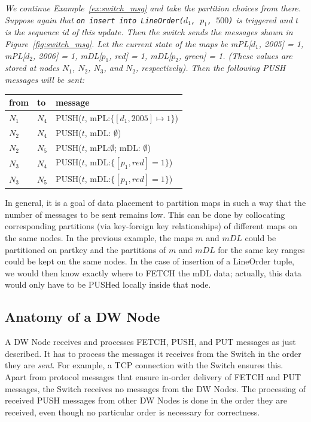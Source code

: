 \begin{example}\em
\label{ex:switch_msg2}
We continue Example~\ref{ex:switch_msg} and take the partition choices
from there.
Suppose again that
{\tt on insert into LineOrder($d_1$, $p_1$, $500$)} is triggered and $t$ is
the sequence id of this update.
Then the switch sends the messages shown in Figure~\ref{fig:switch_msg}.
%
Let the current state of the maps be
mPL[$d_1$, 2005] = 1, mPL[$d_2$, 2006] = 1, mDL[$p_1$, red] = 1,
mDL[$p_2$, green] = 1. (These values are stored at nodes
$N_1$, $N_2$, $N_3$, and $N_2$, respectively).
Then the following PUSH messages will be sent:
\begin{center}
\begin{tabular}{ll|l}
from & to & message \\
\hline
$N_1$ & $N_4$ & PUSH($t$, mPL:$\{ [d_1, 2005] \mapsto 1 \}$) \\
$N_2$ & $N_4$ & PUSH($t$, mDL: $\emptyset$) \\
$N_2$ & $N_5$ & PUSH($t$, mPL:$\emptyset$; mDL: $\emptyset$) \\
$N_3$ & $N_4$ & PUSH($t$, mDL:$\{ [p_1, red] = 1 \}$) \\
$N_3$ & $N_5$ & PUSH($t$, mDL:$\{ [p_1, red] = 1 \}$) \\
\end{tabular}
\end{center}
\end{example}


In general, it is a goal of data placement
to partition maps in such a way that the number of
messages to be sent remains low. This can be done by collocating
corresponding partitions (via key-foreign key relationships)
of different maps on the same nodes.
In the previous example, the maps $m$ and $mDL$
could be partitioned on partkey and the partitions of $m$ and $mDL$ for the
same key ranges could be kept on the same nodes.
In the case of insertion of a LineOrder tuple, we would then know exactly
where to FETCH the mDL data; actually, this data would only have to be
PUSHed locally inside that node.


\subsection{Anatomy of a DW Node}


A DW Node receives and processes FETCH, PUSH, and PUT messages
as just described.
It has to process the messages it receives from the Switch 
in the order they are {\em sent}\/. For example, a
TCP connection with the Switch ensures this. Apart from protocol messages
that ensure in-order delivery of FETCH and PUT messages, the Switch receives no
messages from the DW Nodes.
The processing of received PUSH messages from other DW Nodes is done in the
order they are received, even though no particular order is
necessary for correctness.

